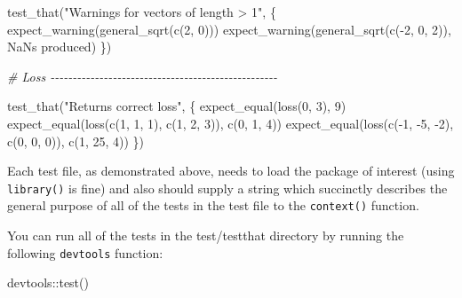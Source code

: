 \documentclass[
]{book}
\newenvironment{Shaded}{\begin{snugshade}}{\end{snugshade}}
\newcommand{\CommentTok}[1]{\textcolor[rgb]{0.56,0.35,0.01}{\textit{#1}}}
\newcommand{\DecValTok}[1]{\textcolor[rgb]{0.00,0.00,0.81}{#1}}
\newcommand{\FunctionTok}[1]{\textcolor[rgb]{0.00,0.00,0.00}{#1}}
\newcommand{\NormalTok}[1]{#1}
\newcommand{\SpecialCharTok}[1]{\textcolor[rgb]{0.00,0.00,0.00}{#1}}
\newcommand{\StringTok}[1]{\textcolor[rgb]{0.31,0.60,0.02}{#1}}
\begin{document}
\begin{Shaded}
\begin{Highlighting}[]
\FunctionTok{test\_that}\NormalTok{(}\StringTok{"Warnings for vectors of length \textgreater{} 1"}\NormalTok{, \{}
  \FunctionTok{expect\_warning}\NormalTok{(}\FunctionTok{general\_sqrt}\NormalTok{(}\FunctionTok{c}\NormalTok{(}\DecValTok{2}\NormalTok{, }\DecValTok{0}\NormalTok{)))}
  \FunctionTok{expect\_warning}\NormalTok{(}\FunctionTok{general\_sqrt}\NormalTok{(}\FunctionTok{c}\NormalTok{(}\SpecialCharTok{{-}}\DecValTok{2}\NormalTok{, }\DecValTok{0}\NormalTok{, }\DecValTok{2}\NormalTok{)), }\StringTok{\textquotesingle{}NaNs produced\textquotesingle{}}\NormalTok{)}
\NormalTok{\})}

\CommentTok{\# Loss {-}{-}{-}{-}{-}{-}{-}{-}{-}{-}{-}{-}{-}{-}{-}{-}{-}{-}{-}{-}{-}{-}{-}{-}{-}{-}{-}{-}{-}{-}{-}{-}{-}{-}{-}{-}{-}{-}{-}{-}{-}{-}{-}{-}{-}{-}{-}{-}{-}{-}{-}}

\FunctionTok{test\_that}\NormalTok{(}\StringTok{"Returns correct loss"}\NormalTok{, \{}
  \FunctionTok{expect\_equal}\NormalTok{(}\FunctionTok{loss}\NormalTok{(}\DecValTok{0}\NormalTok{, }\DecValTok{3}\NormalTok{), }\DecValTok{9}\NormalTok{)}
  \FunctionTok{expect\_equal}\NormalTok{(}\FunctionTok{loss}\NormalTok{(}\FunctionTok{c}\NormalTok{(}\DecValTok{1}\NormalTok{, }\DecValTok{1}\NormalTok{, }\DecValTok{1}\NormalTok{), }\FunctionTok{c}\NormalTok{(}\DecValTok{1}\NormalTok{, }\DecValTok{2}\NormalTok{, }\DecValTok{3}\NormalTok{)), }\FunctionTok{c}\NormalTok{(}\DecValTok{0}\NormalTok{, }\DecValTok{1}\NormalTok{, }\DecValTok{4}\NormalTok{))}
  \FunctionTok{expect\_equal}\NormalTok{(}\FunctionTok{loss}\NormalTok{(}\FunctionTok{c}\NormalTok{(}\SpecialCharTok{{-}}\DecValTok{1}\NormalTok{, }\SpecialCharTok{{-}}\DecValTok{5}\NormalTok{, }\SpecialCharTok{{-}}\DecValTok{2}\NormalTok{), }\FunctionTok{c}\NormalTok{(}\DecValTok{0}\NormalTok{, }\DecValTok{0}\NormalTok{, }\DecValTok{0}\NormalTok{)), }\FunctionTok{c}\NormalTok{(}\DecValTok{1}\NormalTok{, }\DecValTok{25}\NormalTok{, }\DecValTok{4}\NormalTok{))}
\NormalTok{\})}
\end{Highlighting}
\end{Shaded}

Each test file, as demonstrated above, needs to load the package of interest (using \texttt{library()} is fine) and also should supply a string which succinctly describes the general purpose of all of the tests in the test file to the \texttt{context()} function.

You can run all of the tests in the test/testthat directory by running the following \texttt{devtools} function:

\begin{Shaded}
\begin{Highlighting}[]
\NormalTok{devtools}\SpecialCharTok{::}\FunctionTok{test}\NormalTok{()}
\end{Highlighting}
\end{Shaded}
\end{document}
